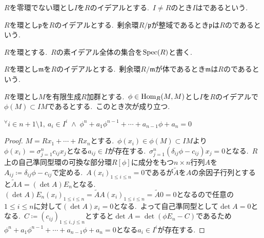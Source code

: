 \begin{definition} \label{def: IsProper}
$R$を零環でない環とし$I$を$R$のイデアルとする.\
$I \neq R$のとき$I$はであるという.
\end{definition}

\begin{definition} \label{def: IsPrime}
$R$を環とし$\mathfrak{p}$を$R$のイデアルとする.\
剰余環$R/\mathfrak{p}$が整域であるとき$\mathfrak{p}$は$R$のであるという.
\end{definition}

\begin{definition}
$R$を環とする.\
$R$の素イデアル全体の集合を$\operatorname{Spec}(R)$と書く.
\end{definition}

\begin{definition} \label{def: IsMaximal}
$R$を環とし$\mathfrak{m}$を$R$のイデアルとする.\
剰余環$R/\mathfrak{m}$が体であるとき$\mathfrak{m}$は$R$のであるという.
\end{definition}

\begin{lemma} \label{lem: determinant_trick}
$R$を環とし$M$を有限生成$R$加群とする.\
$\phi \in \operatorname{Hom}_R(M, M)$とし$I$を$R$のイデアルで$\phi(M) \subset IM$であるとする.\
このとき次が成り立つ.
\begin{center}
    ${^{\forall}i} \in n+1 \setminus 1,\ a_i \in I^i \; \land \; \phi^n + a_1\phi^{n-1} + \cdots + a_{n-1}\phi + a_n = 0$
\end{center}
\end{lemma}
\begin{proof}
$M = Rx_1 + \cdots + Rx_n$とする.\
$\phi(x_i) \in \phi(M) \subset IM$より$\phi(x_i) = \sigma_{j=1}^n c_{ij}x_j$となる$a_{ij} \in I$が存在する.\
$\sigma_{j=1}^n (\delta_{ij} \phi - c_{ij})x_j = 0$となる.\
$R$上の自己準同型環の可換な部分環$R[\phi]$に成分をもつ$n \times n$行列$A$を$A_{ij} \coloneq \delta_{ij} \phi - c_{ij}$で定める.\
$A(x_i)_{1 \le i \le n} = 0$であるが$\tilde{A}$を$A$の余因子行列とすると$\tilde{A}A = (\det A)E_n$となる.\
$(\det A)E_n (x_i)_{1 \le i \le n} = \tilde{A}A (x_i)_{1 \le i \le n} = \tilde{A} 0 = 0$となるので任意の$1 \le i \le n$に対して$(\det A) x_i = 0$となる.\
よって自己準同型として$\det A = 0$となる.\
$C \coloneq (c_{ij})_{1 \le i,j \le n}$とすると$\det A = \det (\phi E_n - C)$であるため$\phi^n + a_1\phi^{n-1} + \cdots + a_{n-1}\phi + a_n = 0$となる$a_i \in I^i$が存在する.
\end{proof}

